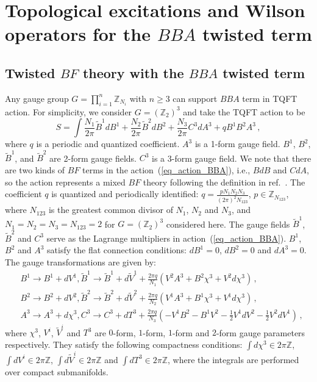 \documentclass[11pt,nofootinbib,preprint]{revtex4-1}
\begin{document}
 
\section{Topological excitations and  Wilson operators for the $BBA$ twisted term\label{s2}}

\subsection{Twisted $BF$ theory with the $BBA$ twisted term}
Any gauge group $G=\prod_{i=1}^n{\mathbb{Z} _{N_i}}$ with $n\geqslant3$ can support $BBA$ term in TQFT action. For simplicity, we consider $G=\left(\mathbb{Z} _{2}\right)^{3}$ and take the TQFT action to be~\cite{Zhang:2021ycl}
\begin{equation}
	S=\int{\frac{N_1}{2\pi}\tilde{B}^1dB^1+}\frac{N_2}{2\pi}\tilde{B}^2dB^2+\frac{N_3}{2\pi}C^3dA^3+qB^1B^2A^3\,,
	\label{eq_action_BBA}
\end{equation}
where $q$ is a periodic and quantized coefficient. $A^3$ is a 1-form gauge field. $B^1$, $B^2$, $\tilde{B}^1$, and $\tilde{B}^2$ are 2-form gauge fields.  $C^3$ is a 3-form gauge field.  We note that there are two kinds of $BF$ terms in the action~(\ref{eq_action_BBA}), i.e., $BdB$ and $CdA$, so the action represents a mixed $BF$ theory following the definition in ref.~\cite{Zhang:2021ycl}.  The coefficient $q$ is quantized and periodically identified: $q=\frac{pN_1N_2N_3}{\left( 2\pi \right) ^2N_{123}}$, $p\in \mathbb{Z} _{N_{123}}$, where $N_{123}$ is the greatest common divisor of $N_{1}$, $N_{2}$ and $N_{3}$, and  $N_{1}=N_{2}=N_{3}=N_{123}=2$ for $G=\left(\mathbb{Z} _{2}\right)^{3}$ considered here.  The gauge fields $\tilde{B}^1$, $\tilde{B}^2$ and $C^3$ serve as the Lagrange multipliers in action~(\ref{eq_action_BBA}). $B^1$, $B^2$ and $A^3$ satisfy the flat connection conditions: $dB^1=0$, $dB^2=0$ and $dA^3=0$. The gauge transformations are given by:
\begin{align}
	&B^1\rightarrow B^1+dV^1, \tilde{B}^1\rightarrow \tilde{B}^1+d\tilde{V}^1+\frac{2\pi q}{N_1}\left( V^2A^3+B^2\chi ^3+V^2d\chi ^3 \right)\,,   
	\\
	&B^2\rightarrow B^2+dV^2, \tilde{B}^2\rightarrow \tilde{B}^2+d\tilde{V}^2+\frac{2\pi q}{N_2}\left( V^1A^3+B^1\chi ^3+V^1d\chi ^3 \right)\,,
	\\
	&A^3\rightarrow A^3+d\chi ^3, C^3\rightarrow C^3+dT^3+\frac{2\pi q}{N_3}\left( -V^1B^2-B^1V^2-\frac{1}{2}V^1dV^2-\frac{1}{2}V^2dV^1 \right) \,,\label{eq_gauge_C3}
\end{align}
where $\chi^3$, $V^i$, $\tilde{V}^i$ and $T^3$ are $0$-form, $1$-form, $1$-form and $2$-form gauge parameters respectively. They satisfy the following compactness conditions: $\int d\chi^3\in2\pi\mathbb{Z}$, $\int dV^i\in2\pi\mathbb{Z}$, $\int d\tilde{V}^i\in2\pi\mathbb{Z}$ and $\int dT^3\in2\pi\mathbb{Z}$, where the integrals are performed over compact submanifolds.
\end{document}
